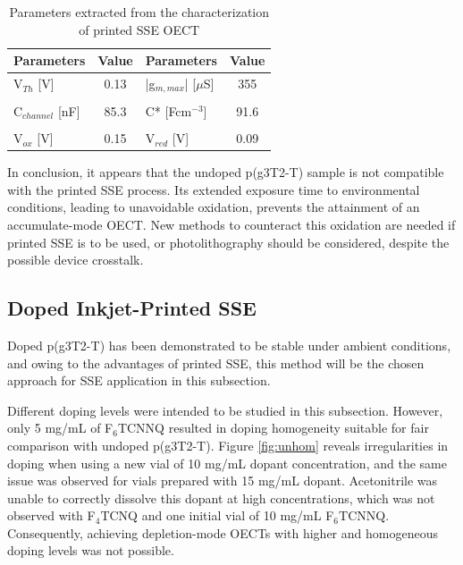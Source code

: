 \begin{table}[ht]
\centering
\caption{Parameters extracted from the characterization of printed SSE OECT}
\begin{tabular}{l|c||l|c}
Parameters & Value & Parameters & Value \\\hline \hline
V$_{Th}$ [V] &  0.13 & |g$_{m,max}$| [$\mu$S] & 355 \\
& & &\\[-1em]
C$_{channel}$ [nF] & 85.3 & C* [Fcm$^{-3}$] & 91.6 \\
& & &\\[-1em]
V$_{ox}$ [V] & 0.15 & V$_{red}$ [V] & 0.09 \\\hline
\hline
\end{tabular}
\label{tab:printedfom}
\end{table}

In conclusion, it appears that the undoped p(g3T2-T) sample is not compatible with the printed SSE process. Its extended exposure time to environmental conditions, leading to unavoidable oxidation, prevents the attainment of an accumulate-mode OECT. New methods to counteract this oxidation are needed if printed SSE is to be used, or photolithography should be considered, despite the possible device crosstalk.

\subsection{Doped Inkjet-Printed SSE} \label{subsec:dopedOECTs}
Doped p(g3T2-T) has been demonstrated to be stable under ambient conditions, and owing to the advantages of printed SSE, this method will be the chosen approach for SSE application in this subsection. 

Different doping levels were intended to be studied in this subsection. However, only 5 mg/mL of F$_{6}$TCNNQ resulted in doping homogeneity suitable for fair comparison with undoped p(g3T2-T). Figure \ref{fig:unhom} reveals irregularities in doping when using a new vial of 10 mg/mL dopant concentration, and the same issue was observed for vials prepared with 15 mg/mL dopant. Acetonitrile was unable to correctly dissolve this dopant at high concentrations, which was not observed with F$_{4}$TCNQ and one initial vial of 10 mg/mL F$_{6}$TCNNQ. Consequently, achieving depletion-mode OECTs with higher and homogeneous doping levels was not possible.

